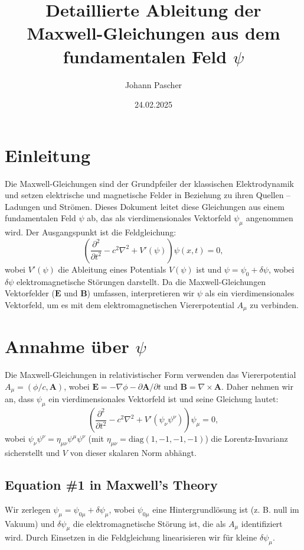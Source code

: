 \documentclass{article}
\title{Detaillierte Ableitung der Maxwell-Gleichungen aus dem fundamentalen Feld \(\psi\)}
\author{Johann Pascher}
\date{24.02.2025}
\begin{document}
	
	\maketitle
	
	\section{Einleitung}
	Die Maxwell-Gleichungen sind der Grundpfeiler der klassischen Elektrodynamik und setzen elektrische und magnetische Felder in Beziehung zu ihren Quellen – Ladungen und Strömen. Dieses Dokument leitet diese Gleichungen aus einem fundamentalen Feld \(\psi\) ab, das als vierdimensionales Vektorfeld \(\psi_\mu\) angenommen wird. Der Ausgangspunkt ist die Feldgleichung:
	\[
	\left( \frac{\partial^2}{\partial t^2} - c^2 \nabla^2 + V'(\psi) \right) \psi(x,t) = 0,
	\]
	wobei \(V'(\psi)\) die Ableitung eines Potentials \(V(\psi)\) ist und \(\psi = \psi_0 + \delta \psi\), wobei \(\delta \psi\) elektromagnetische Störungen darstellt. Da die Maxwell-Gleichungen Vektorfelder (\(\mathbf{E}\) und \(\mathbf{B}\)) umfassen, interpretieren wir \(\psi\) als ein vierdimensionales Vektorfeld, um es mit dem elektromagnetischen Viererpotential \(A_\mu\) zu verbinden.
	
	\section{Annahme über \(\psi\)}
	Die Maxwell-Gleichungen in relativistischer Form verwenden das Viererpotential \(A_\mu = (\phi/c, \mathbf{A})\), wobei \(\mathbf{E} = -\nabla \phi - \partial \mathbf{A}/\partial t\) und \(\mathbf{B} = \nabla \times \mathbf{A}\). Daher nehmen wir an, dass \(\psi_\mu\) ein vierdimensionales Vektorfeld ist und seine Gleichung lautet:
	\[
	\left( \frac{\partial^2}{\partial t^2} - c^2 \nabla^2 + V'(\psi_\nu \psi^\nu) \right) \psi_\mu = 0,
	\]
	wobei \(\psi_\nu \psi^\nu = \eta_{\mu\nu} \psi^\mu \psi^\nu\) (mit \(\eta_{\mu\nu} = \text{diag}(1, -1, -1, -1)\)) die Lorentz-Invarianz sicherstellt und \(V\) von dieser skalaren Norm abhängt.
	
	\subsection{Equation \#1 in Maxwell's Theory}
	Wir zerlegen \(\psi_\mu = \psi_{0\mu} + \delta \psi_\mu\), wobei \(\psi_{0\mu}\) eine Hintergrundlösung ist (z. B. null im Vakuum) und \(\delta \psi_\mu\) die elektromagnetische Störung ist, die als \(A_\mu\) identifiziert wird. Durch Einsetzen in die Feldgleichung linearisieren wir für kleine \(\delta \psi_\mu\).
	
\end{document}
